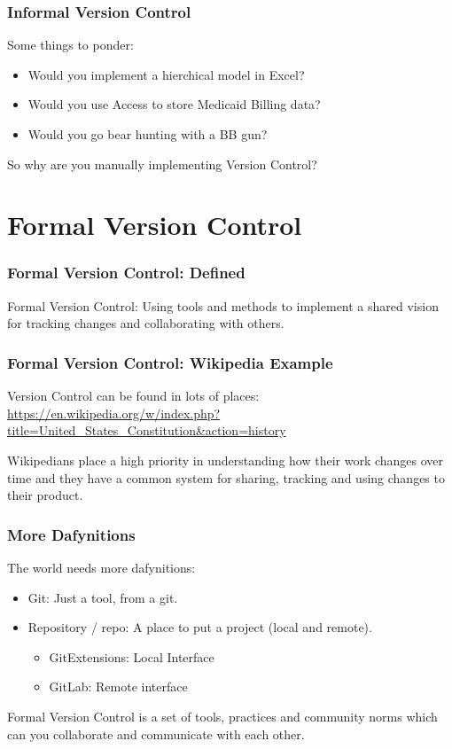 \documentclass{beamer}
\begin{document}
\begin{frame}
  \frametitle{Informal Version Control}
  Some things to ponder:
  \bigskip
  \begin{itemize}
  \item Would you implement a hierchical model in Excel?
  \item Would you use Access to store Medicaid Billing data?
  \item Would you go bear hunting with a BB gun?
  \end{itemize}
  \pause
  \bigskip
  \bigskip
  {\large So why are you manually implementing Version Control?}
  
\end{frame}

\section{Formal Version Control}

\begin{frame}
  \frametitle{Formal Version Control: Defined}

  Formal Version Control: Using tools and methods to implement a
  shared vision for tracking changes and collaborating with others.
  
 \end{frame}
 
\begin{frame}
  \frametitle{Formal Version Control: Wikipedia Example}

  Version Control can be found in lots of places:\\
  
  \smallskip
  {\tiny{\url{https://en.wikipedia.org/w/index.php?title=United\_States\_Constitution\&action=history}}}

  \bigskip
  Wikipedians place a high priority in understanding how their work
  changes over time and they have a common system for sharing,
  tracking and using changes to their product.

\end{frame}

\begin{frame}
  \frametitle{More Dafynitions}

  The world needs more dafynitions:
  
  \begin{itemize}
  \item Git: Just a tool, from a git.
  \item Repository / repo: A place to put a project (local and
    remote).
    \begin{itemize}
    \item GitExtensions: Local Interface
    \item GitLab: Remote interface
    \end{itemize}
  \end{itemize}

  \bigskip
  Formal Version Control is a set of tools, practices and community
  norms which can you collaborate and communicate with each
  other.
  
\end{frame}
\end{document}

